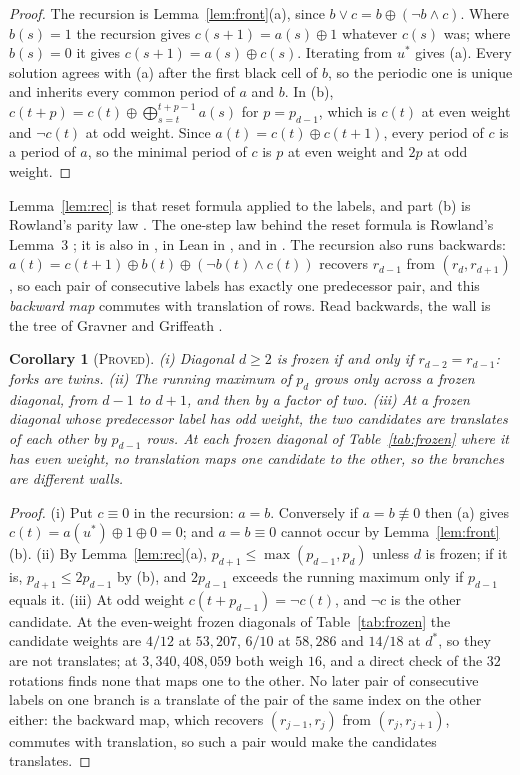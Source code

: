 \documentclass[11pt]{article}
\newtheorem{corollary}[theorem]{Corollary}
\theoremstyle{definition}
\theoremstyle{remark}
\newcommand{\PROVED}{\textsc{Proved}}
\newcommand{\dstar}{d^{*}}
\begin{document}
\begin{proof}
The recursion is Lemma~\ref{lem:front}(a), since $b\vee c=b\oplus(\neg b\wedge c)$. Where $b(s)=1$ the recursion gives $c(s+1)=a(s)\oplus1$ whatever $c(s)$ was; where $b(s)=0$ it gives $c(s+1)=a(s)\oplus c(s)$. Iterating from $u^*$ gives (a). Every solution agrees with (a) after the first black cell of $b$, so the periodic one is unique and inherits every common period of $a$ and $b$. In (b), $c(t+p)=c(t)\oplus\bigoplus_{s=t}^{t+p-1}a(s)$ for $p=p_{d-1}$, which is $c(t)$ at even weight and $\neg c(t)$ at odd weight. Since $a(t)=c(t)\oplus c(t+1)$, every period of $c$ is a period of $a$, so the minimal period of $c$ is $p$ at even weight and $2p$ at odd weight.
\end{proof}

Lemma~\ref{lem:rec} is that reset formula applied to the labels, and part (b) is Rowland's parity law \cite{Rowland}. The one-step law behind the reset formula is Rowland's Lemma~3 \cite{Rowland}; it is also in \cite{Pat2}, in Lean in \cite{Dib2}, and in \cite{Ner}. The recursion also runs backwards: $a(t)=c(t+1)\oplus b(t)\oplus(\neg b(t)\wedge c(t))$ recovers $r_{d-1}$ from $(r_d,r_{d+1})$, so each pair of consecutive labels has exactly one predecessor pair, and this \emph{backward map} commutes with translation of rows. Read backwards, the wall is the tree of Gravner and Griffeath \cite{GG}.

\begin{corollary}[\PROVED]\label{cor:forks}
(i) Diagonal $d\ge2$ is frozen if and only if $r_{d-2}=r_{d-1}$: forks are twins.
(ii) The running maximum of $p_d$ grows only across a frozen diagonal, from $d-1$ to $d+1$, and then by a factor of two.
(iii) At a frozen diagonal whose predecessor label has odd weight, the two candidates are translates of each other by $p_{d-1}$ rows. At each frozen diagonal of Table~\ref{tab:frozen} where it has even weight, no translation maps one candidate to the other, so the branches are different walls.
\end{corollary}

\begin{proof}
(i) Put $c\equiv0$ in the recursion: $a=b$. Conversely if $a=b\not\equiv0$ then (a) gives $c(t)=a(u^*)\oplus1\oplus0=0$; and $a=b\equiv0$ cannot occur by Lemma~\ref{lem:front}(b). (ii) By Lemma~\ref{lem:rec}(a), $p_{d+1}\le\max(p_{d-1},p_d)$ unless $d$ is frozen; if it is, $p_{d+1}\le2p_{d-1}$ by (b), and $2p_{d-1}$ exceeds the running maximum only if $p_{d-1}$ equals it. (iii) At odd weight $c(t+p_{d-1})=\neg c(t)$, and $\neg c$ is the other candidate. At the even-weight frozen diagonals of Table~\ref{tab:frozen} the candidate weights are $4/12$ at $53{,}207$, $6/10$ at $58{,}286$ and $14/18$ at $\dstar$, so they are not translates; at $3{,}340{,}408{,}059$ both weigh $16$, and a direct check of the $32$ rotations finds none that maps one to the other. No later pair of consecutive labels on one branch is a translate of the pair of the same index on the other either: the backward map, which recovers $(r_{j-1},r_j)$ from $(r_j,r_{j+1})$, commutes with translation, so such a pair would make the candidates translates.
\end{proof}
\end{document}
